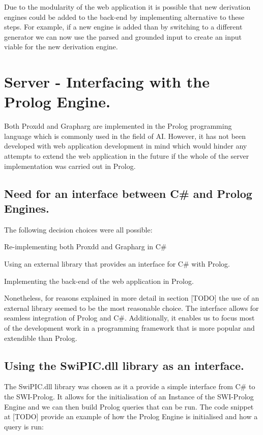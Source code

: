 Due to the modularity of the web application it is possible that new derivation engines could be added to the back-end by implementing alternative to these steps. For example, if a new engine is added than by switching to a different generator we can now use the parsed and grounded input to create an input viable for the new derivation engine.

\section{Server - Interfacing with the Prolog Engine.}

Both Proxdd and Grapharg are implemented in the Prolog programming language which is commonly used in the field of AI. However, it has not been developed with web application development in mind which would hinder any attempts to extend the web application in the future if the whole of the server implementation was carried out in Prolog. 

\subsection{Need for an interface between C\# and Prolog Engines.}

The following decision choices were all possible:

\begin{itemize*}
\item Re-implementing both Proxdd and Grapharg in C\#
\item Using an external library that provides an interface for C\# with Prolog.
\item Implementing the back-end of the web application in Prolog.
\end{itemize*}

Nonetheless, for reasons explained in more detail in section [TODO] the use of an external library seemed to be the most reasonable choice. The interface allows for seamless integration of Prolog and C\#. Additionally, it enables us to focus most of the development work in a programming framework that is more popular and extendible than Prolog.

\subsection{Using the SwiPIC.dll library as an interface.}

The SwiPIC.dll library was chosen as it a provide a simple interface from C\# to the SWI-Prolog. It allows for the initialisation of an Instance of the SWI-Prolog Engine and we can then build Prolog queries that can be run. The code snippet at [TODO] provide an example of how the Prolog Engine is initialised and how a query is run:

